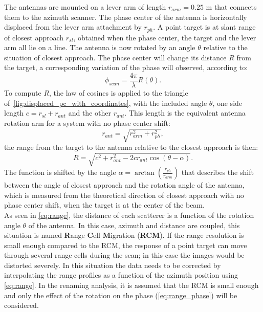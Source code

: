 The antennas are mounted on a lever arm of length $r_{arm} = 0.25$ m that connects them to the azimuth scanner. The phase center of the antenna is horizontally displaced from the lever arm attachment by $r_{ph}$. A point target is at slant range  of closest approach $r_{sl}$, obtained when the phase center, the target and the lever arm all lie on a line. The antenna is now rotated by an angle $\theta$ relative to the situation of closest approach. The phase center will change its distance $R$ from the target, a corresponding variation of the phase will observed, according to:
\begin{equation}\label{eq:range_phase}
	\phi_{scan} = \frac{4 \pi}{\lambda}R\left(\theta\right).
\end{equation}
To compute $R$, the law of cosines is applied to the triangle of~\autoref{fig:displaced_pc_with_coordinates}, with the included angle $\theta$, one side length $c = r_{sl} + r_{ant}$ and the other $r_{ant}$. This length is the equivalent antenna rotation arm for a system with no phase center shift:
\begin{equation}
	r_{ant} = \sqrt{r_{arm}^2 + r_{ph}^2},
\end{equation}
the range from the target to the antenna relative to the closest approach is then:
\begin{equation}\label{eq:range}
	R = \sqrt{ c^2 +  r_{ant}^2 - 2 c r_{ant} \cos{\left(\theta  - \alpha\right)}}.
\end{equation}
The function is shifted by the angle  $\alpha = \operatorname{\arctan}\left({\frac{r_{ph}}{r_{arm}}}\right)$ that describes the shift between the angle of closest approach and the rotation angle of the antenna, which is measured from the theoretical direction of closest approach with no phase center shift, when the target is at the center of the beam.\\
As seen in \autoref{eq:range}, the distance of each scatterer is a function of the rotation angle $\theta$ of the antenna. In this case, azimuth and distance are coupled, this situation is named \textbf{R}ange \textbf{C}ell \textbf{M}igration (\textbf{RCM}). If the range resolution is small enough compared to the RCM, the response of a point target can move through several range cells during the scan; in this case the images would be distorted severely. In this situation the data needs to be corrected by interpolating the range profiles as a function of the azimuth position using \autoref{eq:range}. In the renaming analysis, it is assumed that the RCM is small enough and only the effect of the rotation on the phase (\autoref{eq:range_phase}) will be considered.\\
